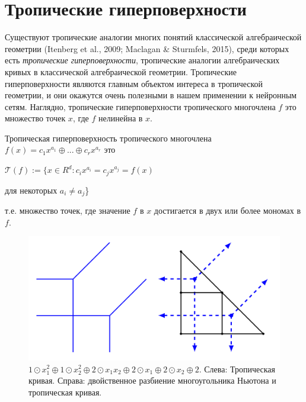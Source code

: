 \documentclass[russian]{lecture-notes}
\begin{document}
	\section{Тропические гиперповерхности}
	Существуют тропические аналогии многих понятий классической алгебраической геометрии (Itenberg et al., 2009; Maclagan \& Sturmfels, 2015), среди которых есть \textit{тропические гиперповерхности}, тропические аналогии алгебраических кривых в классической алгебраической геометрии. Тропические гиперповерхности являются главным объектом интереса в тропической геометрии, и они окажутся очень полезными в нашем применении к нейронным сетям. Наглядно, тропические гиперповерхности тропического многочлена $f$ это множество точек $x$, где $f$ нелинейна в $x$.
	
	\begin{Definition}
		Тропическая гиперповерхность тропического многочлена $f(x) = c_1x^{a_1} \oplus ... \oplus c_rx^{a_r}$ это
		\begin{center}
			$\mathcal{T}(f) := \{x \in R^d : c_ix^{a_i} = c_jx^{a_j} = f(x)$ 
		\end{center}
		\begin{flushright}
			для некоторых $a_i \neq a_j$\}
		\end{flushright}
		т.е. множество точек, где значение $f$ в $x$ достигается в двух или более мономах в $f$.
	\end{Definition}

	\begin{figure}[h]
		\centering
		\includegraphics{tropical_curve.png}
		\caption{$1 \odot x_1^2 \oplus 1 \odot x_2^2 \oplus 2 \odot x_1x_2 \oplus 2 \odot x_1 \oplus 2 \odot x_2 \oplus 2.$ Слева: Тропическая кривая. Справа: двойственное разбиение многоугольника Ньютона и тропическая кривая.}
	\end{figure}
\end{document}
